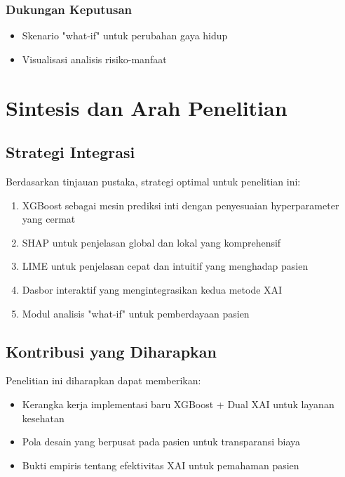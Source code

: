 \subsubsection{Dukungan Keputusan}
\begin{itemize}
    \item Skenario "what-if" untuk perubahan gaya hidup
    \item Visualisasi analisis risiko-manfaat
\end{itemize}

\section{Sintesis dan Arah Penelitian}

\subsection{Strategi Integrasi}
Berdasarkan tinjauan pustaka, strategi optimal untuk penelitian ini:
\begin{enumerate}
    \item XGBoost sebagai mesin prediksi inti dengan penyesuaian hyperparameter yang cermat
    \item SHAP untuk penjelasan global dan lokal yang komprehensif
    \item LIME untuk penjelasan cepat dan intuitif yang menghadap pasien
    \item Dasbor interaktif yang mengintegrasikan kedua metode XAI
    \item Modul analisis "what-if" untuk pemberdayaan pasien
\end{enumerate}

\subsection{Kontribusi yang Diharapkan}
Penelitian ini diharapkan dapat memberikan:
\begin{itemize}
    \item Kerangka kerja implementasi baru XGBoost + Dual XAI untuk layanan kesehatan
    \item Pola desain yang berpusat pada pasien untuk transparansi biaya
    \item Bukti empiris tentang efektivitas XAI untuk pemahaman pasien
\end{itemize}

